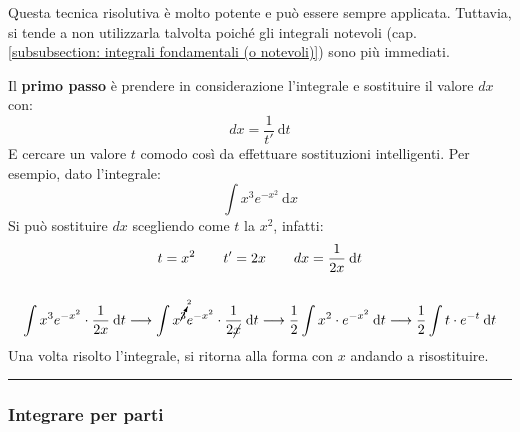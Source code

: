 \documentclass[a4paper]{article}
\newcommand{\longline}{\noindent\rule{\textwidth}{0.4pt}}
\begin{document}
	Questa tecnica risolutiva è molto potente e può essere sempre applicata. Tuttavia, si tende a non utilizzarla talvolta poiché gli integrali notevoli (cap. \ref{subsubsection: integrali fondamentali (o notevoli)}) sono più immediati.\newline

	\noindent
	Il \textbf{primo passo} è prendere in considerazione l'integrale e sostituire il valore $dx$ con:
	\begin{equation*}
		dx = \dfrac{1}{t'} \: \mathrm{d}t
	\end{equation*}
	E cercare un valore $t$ comodo così da effettuare sostituzioni intelligenti. Per esempio, dato l'integrale:
	\begin{equation*}
		\displaystyle\int x^{3}e^{-x^{2}} \: \mathrm{d}x
	\end{equation*}
	Si può sostituire $dx$ scegliendo come $t$ la $x^{2}$, infatti:
	\begin{gather*}
		t = x^{2} \hspace{2em} t' = 2x \hspace{2em} dx = \dfrac{1}{2x} \: \mathrm{d}t \\ \\
		\displaystyle\int x^{3}e^{-x^{2}} \cdot \dfrac{1}{2x} \: \mathrm{d}t
		\longrightarrow
		\displaystyle\int x^{\cancelto{2}{3}}e^{-x^{2}} \cdot \dfrac{1}{2\cancel{x}} \: \mathrm{d}t
		\longrightarrow
		\displaystyle\dfrac{1}{2}\int x^{2} \cdot e^{-x^{2}} \: \mathrm{d}t
		\longrightarrow
		\displaystyle\dfrac{1}{2}\int t \cdot e^{-t} \: \mathrm{d}t
	\end{gather*}
	Una volta risolto l'integrale, si ritorna alla forma con $x$ andando a risostituire.
	
	\longline

	\subsubsection{Integrare per parti}\label{subsubsection: integrare per parti}
\end{document}
